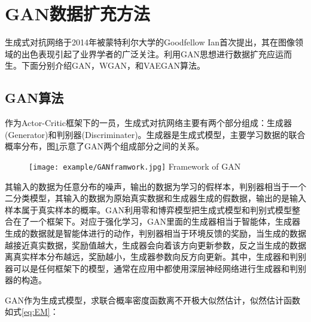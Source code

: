 \section{GAN数据扩充方法}
生成式对抗网络于2014年被蒙特利尔大学的Goodfellow Ian首次提出，其在图像领域的出色表现引起了业界学者的广泛关注。利用GAN思想进行数据扩充应运而生。下面分别介绍GAN，WGAN，和VAEGAN算法。
\subsection{GAN算法}
作为Actor-Critic框架下的一员，生成式对抗网络主要有两个部分组成：生成器(Generator)和判别器(Discriminater)。生成器是生成式模型，主要学习数据的联合概率分布，图\ref{fig:GAN2}示意了GAN两个组成部分之间的关系。

\begin{figure}[htbp]
	\centering
	\texttt{[image: example/GANframwork.jpg]}
	{Framework of GAN}
	\label{fig:GAN2}
\end{figure}
其输入的数据为任意分布的噪声，输出的数据为学习的假样本，判别器相当于一个二分类模型，其输入的数据为原始真实数据和生成器生成的假数据，输出的是输入样本属于真实样本的概率。GAN利用零和博弈模型把生成式模型和判别式模型整合在了一个框架下。对应于强化学习，GAN里面的生成器相当于智能体，生成器生成的数据就是智能体进行的动作，判别器相当于环境反馈的奖励，当生成的数据越接近真实数据，奖励值越大，生成器会向着该方向更新参数，反之当生成的数据离真实样本分布越远，奖励越小，生成器参数向反方向更新。其中，生成器和判别器可以是任何框架下的模型，通常在应用中都使用深层神经网络进行生成器和判别器的构造。

GAN作为生成式模型，求联合概率密度函数离不开极大似然估计，似然估计函数如式\ref{eq:EM}：

